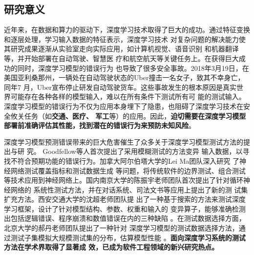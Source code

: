 
\subsection{研究意义}



%
近年来，在数据和算力的驱动下，深度学习技术取得了巨大的成功。通过特征变换和逐层处理，学习输入数据的特征表示，深度学习技术
对复杂问题的解决能力使其研究成果逐渐从实验室走向实际应用，如计算机视觉、语音识别
和机器翻译等，并开始部署在自动驾驶、智慧医
疗和航空航天等关键任务上。在获得巨大成功的同时，深度学习模型的错误行为
也导致了很多安全事故。2018年3月19日，在美国亚利桑那州，一辆处在自动驾驶状态的Uber撞击一名女子，致其不幸身亡，同年7
月，Uber宣布停止研发自动驾驶货车。这些事故发生的根本原因是真实世界可能存在各种各样的模型输入，难以在所有条件下测试所有可
能的测试输入。深度学习模型的错误行为不仅为应用本身埋下了隐患，也阻碍了深度学习技术在安全攸关任务（如\textbf{交通、医疗、
    军工}等）的应用。因此，\textbf{迫切需要在深度学习模型部署前准确评估其性能，找到潜在的错误行为来预防未知风险}。%





深度学习模型预测错误带来的巨大危害催生了众多关于深度学习模型测试方法的提出与研
究。 Goodfellow等人首次提出了采用模糊测试的方法变异
输入数据，以寻找不符合预期功能的错误行为。加拿大阿尔伯塔大学的Lei Ma团队深入研究
了神经网络测试覆盖指标和测试数据生成
等问题，将传统软件的边界测试、组合测试
等技术应用到神经网络上。国内南京大学的陈振宇老师团队首次提出了针对循环神经网络的
系统性测试方法，并在对话系统、司法文书等应用上提出了新的测
试集扩充方法。西安交通大学的沈超老师团队提
出了一种基于搜索的方法来测试深度学习框架，设计了针对模型结构、参数、权重和输入的
变异算子，能够准确检测出包括逻辑错误、程序崩溃和数值错误在内的三种缺陷
。在测试数据选择方面，北京大学的郝丹老师团队提出了一种针对
深度学习模型的测试数据选择方法，通过测试子集模拟大规模测试集的分布，估算模型性能
。\textbf{面向深度学习系统的测试方法在学术界取得了显著成
    效，已成为软件工程领域的新兴研究热点。}

